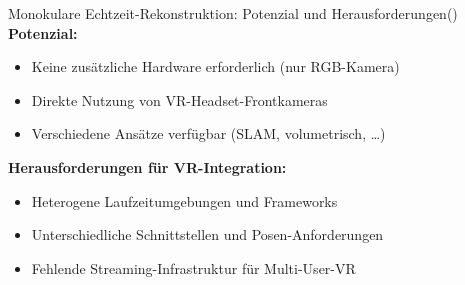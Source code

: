 \begin{frame}{Monokulare Echtzeit-Rekonstruktion: Potenzial und Herausforderungen}{(\cite{sun2021neuralreconrealtimecoherent3d,gao2023visfusionvisibilityawareonline3d,liu2025slam3rrealtimedensescene, murai2025mast3rslamrealtimedenseslam})}
    \textbf{Potenzial:}
    \begin{itemize}
        \item Keine zusätzliche Hardware erforderlich (nur RGB-Kamera)
        \item Direkte Nutzung von VR-Headset-Frontkameras
        \item Verschiedene Ansätze verfügbar (SLAM, volumetrisch, \dots)
    \end{itemize}
    
    \vfill
    
    \textbf{Herausforderungen für VR-Integration:}
    \begin{itemize}
        \item Heterogene Laufzeitumgebungen und Frameworks
        \item Unterschiedliche Schnittstellen und Posen-Anforderungen
        \item Fehlende Streaming-Infrastruktur für Multi-User-VR
    \end{itemize}
\end{frame}


    
